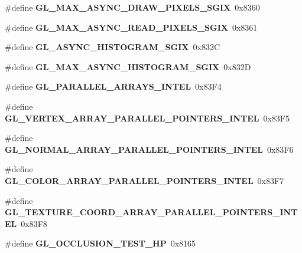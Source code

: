 \begin{DoxyCompactItemize}
\item 
\#define {\bfseries G\+L\+\_\+\+M\+A\+X\+\_\+\+A\+S\+Y\+N\+C\+\_\+\+D\+R\+A\+W\+\_\+\+P\+I\+X\+E\+L\+S\+\_\+\+S\+G\+I\+X}~0x8360\label{_s_d_l__opengl_8h_a2f654a610cef0663b32cd558ab578c80}

\item 
\#define {\bfseries G\+L\+\_\+\+M\+A\+X\+\_\+\+A\+S\+Y\+N\+C\+\_\+\+R\+E\+A\+D\+\_\+\+P\+I\+X\+E\+L\+S\+\_\+\+S\+G\+I\+X}~0x8361\label{_s_d_l__opengl_8h_abe7bfeea62e567d3b26b4a41f5c089ea}

\item 
\#define {\bfseries G\+L\+\_\+\+A\+S\+Y\+N\+C\+\_\+\+H\+I\+S\+T\+O\+G\+R\+A\+M\+\_\+\+S\+G\+I\+X}~0x832\+C\label{_s_d_l__opengl_8h_a4c83d738a0808bde491e764d04390a37}

\item 
\#define {\bfseries G\+L\+\_\+\+M\+A\+X\+\_\+\+A\+S\+Y\+N\+C\+\_\+\+H\+I\+S\+T\+O\+G\+R\+A\+M\+\_\+\+S\+G\+I\+X}~0x832\+D\label{_s_d_l__opengl_8h_a27b544ff6f42fdc0e38da69560879758}

\item 
\#define {\bfseries G\+L\+\_\+\+P\+A\+R\+A\+L\+L\+E\+L\+\_\+\+A\+R\+R\+A\+Y\+S\+\_\+\+I\+N\+T\+E\+L}~0x83\+F4\label{_s_d_l__opengl_8h_aa677658e85f86b0804ccf291c9b1cee1}

\item 
\#define {\bfseries G\+L\+\_\+\+V\+E\+R\+T\+E\+X\+\_\+\+A\+R\+R\+A\+Y\+\_\+\+P\+A\+R\+A\+L\+L\+E\+L\+\_\+\+P\+O\+I\+N\+T\+E\+R\+S\+\_\+\+I\+N\+T\+E\+L}~0x83\+F5\label{_s_d_l__opengl_8h_ac10e7911b67cb7919439291095f8a623}

\item 
\#define {\bfseries G\+L\+\_\+\+N\+O\+R\+M\+A\+L\+\_\+\+A\+R\+R\+A\+Y\+\_\+\+P\+A\+R\+A\+L\+L\+E\+L\+\_\+\+P\+O\+I\+N\+T\+E\+R\+S\+\_\+\+I\+N\+T\+E\+L}~0x83\+F6\label{_s_d_l__opengl_8h_af998ad9c6b8192793730388fa88a1c14}

\item 
\#define {\bfseries G\+L\+\_\+\+C\+O\+L\+O\+R\+\_\+\+A\+R\+R\+A\+Y\+\_\+\+P\+A\+R\+A\+L\+L\+E\+L\+\_\+\+P\+O\+I\+N\+T\+E\+R\+S\+\_\+\+I\+N\+T\+E\+L}~0x83\+F7\label{_s_d_l__opengl_8h_a2d930d0fab00c3cb5fc5a3f1e2e586d4}

\item 
\#define {\bfseries G\+L\+\_\+\+T\+E\+X\+T\+U\+R\+E\+\_\+\+C\+O\+O\+R\+D\+\_\+\+A\+R\+R\+A\+Y\+\_\+\+P\+A\+R\+A\+L\+L\+E\+L\+\_\+\+P\+O\+I\+N\+T\+E\+R\+S\+\_\+\+I\+N\+T\+E\+L}~0x83\+F8\label{_s_d_l__opengl_8h_a0a9de9b6448574f74ff594a64c760748}

\item 
\#define {\bfseries G\+L\+\_\+\+O\+C\+C\+L\+U\+S\+I\+O\+N\+\_\+\+T\+E\+S\+T\+\_\+\+H\+P}~0x8165\label{_s_d_l__opengl_8h_a22daf1b41f916066c813394a809f5109}


\end{DoxyCompactItemize}
